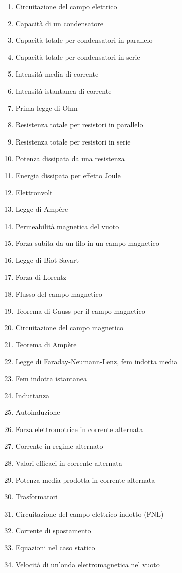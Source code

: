 \documentclass[a4paper,11pt,italian]{article}
\begin{document}
\begin{enumerate}
\item Circuitazione del campo elettrico
\item Capacità di un condensatore
\item Capacità totale per condensatori in parallelo
\item Capacità totale per condensatori in serie
\item Intensità media di corrente
\item Intensità istantanea di corrente
\item Prima legge di Ohm
\item Resistenza totale per resistori in parallelo
\item Resistenza totale per resistori in serie
\item Potenza dissipata da una resistenza
\item Energia dissipata per effetto Joule
\item Elettronvolt
\item Legge di Ampère
\item Permeabilità magnetica del vuoto
\item Forza subita da un filo in un campo magnetico
\item Legge di Biot-Savart
\item Forza di Lorentz
\item Flusso del campo magnetico
\item Teorema di Gauss per il campo magnetico
\item Circuitazione del campo magnetico
\item Teorema di Ampère
\item Legge di Faraday-Neumann-Lenz, fem indotta media
\item Fem indotta istantanea
\item Induttanza
\item Autoinduzione
\item Forza elettromotrice in corrente alternata
\item Corrente in regime alternato
\item Valori efficaci in corrente alternata
\item Potenza media prodotta in corrente alternata
\item Trasformatori
\item Circuitazione del campo elettrico indotto (FNL)
\item Corrente di spostamento
\item Equazioni nel caso statico
\item Velocità di un'onda elettromagnetica nel vuoto

\end{enumerate}
\end{document}
